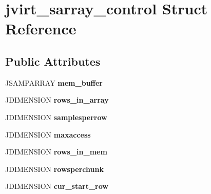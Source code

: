\hypertarget{structjvirt__sarray__control}{}\section{jvirt\+\_\+sarray\+\_\+control Struct Reference}
\label{structjvirt__sarray__control}
\subsection*{Public Attributes}
\begin{DoxyCompactItemize}
\item 
J\+S\+A\+M\+P\+A\+R\+R\+AY {\bfseries mem\+\_\+buffer}\hypertarget{structjvirt__sarray__control_abc1f86c02141d80dc5d443e57a1d36d6}{}\label{structjvirt__sarray__control_abc1f86c02141d80dc5d443e57a1d36d6}

\item 
J\+D\+I\+M\+E\+N\+S\+I\+ON {\bfseries rows\+\_\+in\+\_\+array}\hypertarget{structjvirt__sarray__control_a17d42465a9cedfd4feeb93edfd8d134a}{}\label{structjvirt__sarray__control_a17d42465a9cedfd4feeb93edfd8d134a}

\item 
J\+D\+I\+M\+E\+N\+S\+I\+ON {\bfseries samplesperrow}\hypertarget{structjvirt__sarray__control_a3b6c756c3a71dc8023672093a60cc4f1}{}\label{structjvirt__sarray__control_a3b6c756c3a71dc8023672093a60cc4f1}

\item 
J\+D\+I\+M\+E\+N\+S\+I\+ON {\bfseries maxaccess}\hypertarget{structjvirt__sarray__control_a719350d4faf724c6617a5892aae8ec2a}{}\label{structjvirt__sarray__control_a719350d4faf724c6617a5892aae8ec2a}

\item 
J\+D\+I\+M\+E\+N\+S\+I\+ON {\bfseries rows\+\_\+in\+\_\+mem}\hypertarget{structjvirt__sarray__control_aac15348d4b307c8aacc631b96aa3b547}{}\label{structjvirt__sarray__control_aac15348d4b307c8aacc631b96aa3b547}

\item 
J\+D\+I\+M\+E\+N\+S\+I\+ON {\bfseries rowsperchunk}\hypertarget{structjvirt__sarray__control_ad1c55661955e1600d447ad754c6aece1}{}\label{structjvirt__sarray__control_ad1c55661955e1600d447ad754c6aece1}

\item 
J\+D\+I\+M\+E\+N\+S\+I\+ON {\bfseries cur\+\_\+start\+\_\+row}\hypertarget{structjvirt__sarray__control_a84ae28e5bf362228d7f43b486239e873}{}\label{structjvirt__sarray__control_a84ae28e5bf362228d7f43b486239e873}


\end{DoxyCompactItemize}
